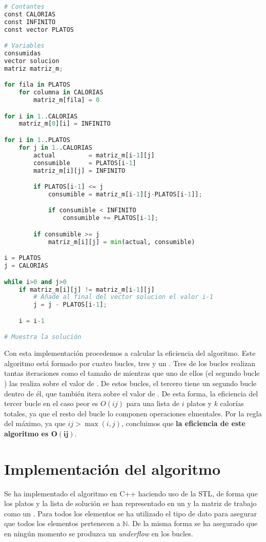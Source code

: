 \begin{lstlisting}[language=Python]
# Contantes
const CALORIAS
const INFINITO
const vector PLATOS

# Variables
consumidas
vector solucion
matriz matriz_m;

for fila in PLATOS
	for columna in CALORIAS
		matriz_m[fila] = 0

for i in 1..CALORIAS
	matriz_m[0][i] = INFINITO

for i in 1..PLATOS
	for j in 1..CALORIAS
		actual         = matriz_m[i-1][j]
		consumible     = PLATOS[i-1]
		matriz_m[i][j] = INFINITO

		if PLATOS[i-1] <= j
			consumible = matriz_m[i-1][j-PLATOS[i-1]];

			if consumible < INFINITO
				consumible += PLATOS[i-1];

		if consumible >= j
			matriz_m[i][j] = min(actual, consumible)

i = PLATOS
j = CALORIAS

while i>0 and j>0
	if matriz_m[i][j] != matriz_m[i-1][j]
		# Añade al final del vector solucion el valor i-1
		j = j - PLATOS[i-1];

	i = i-1

# Muestra la solución
\end{lstlisting}

Con esta implementación procedemos a calcular la eficiencia del algoritmo.
Este algoritmo está formado por cuatro bucles, tres  y un .
Tres de los bucles realizan tantas iteraciones como el tamaño de  mientras que uno de ellos (el segundo bucle ) las realiza sobre el valor de .
De estos bucles, el tercero tiene un segundo bucle  dentro de él, que también itera sobre el valor de .
De esta forma, la eficiencia del tercer bucle  en el caso peor es $O(ij)$ para una lista de $i$ platos y $k$ calorías totales, ya que el resto del bucle lo componen operaciones elmentales.
Por la regla del máximo, ya que $ij>\max(i,j)$, concluimos que \textbf{la eficiencia de este algoritmo es $\boldsymbol{O(ij)}$}.

\section{Implementación del algoritmo}

Se ha implementado el algoritmo en C++ haciendo uso de la STL, de forma que los platos y la lista de solución se han representado en un  y la matriz de trabajo como un .
Para todos los elementos se ha utilizado el tipo de dato  para asegurar que todos los elementos pertenecen a $\mathbb{N}$.
De la misma forma se ha asegurado que en ningún momento se produzca un \textit{underflow} en los bucles.

